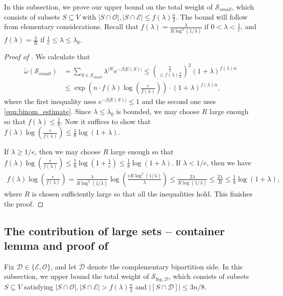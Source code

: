 \documentclass[reqno,a4paper,11pt]{amsart}
\newcommand{\cD}{\mathcal{D}}
\newcommand{\cE}{\mathcal{E}}
\newcommand{\cO}{\mathcal{O}}
\newcommand{\cS}{\mathcal{S}}
\newcommand{\lam}{\lambda}
\begin{document}
In this subsection, we prove our upper bound on the total weight of $\cS_{small}$, which consists of subsets $S \subseteq V$ with $|S \cap \cO|, |S \cap \cE| \leq f(\lam)\frac{n}{2}$. The bound will follow from elementary considerations. Recall that $f(\lam) = \frac{\lam}{R \log^2(1/\lam)}$ if $0 < \lam < \frac{1}{e}$, and $f(\lam) = \frac{\lam}{R}$ if $\frac{1}{e} \le \lam \le \lam_0$.
\begin{proof}[Proof of ]

We calculate that
\begin{align*}
    \tilde{\omega}(\cS_{small}) &= \sum_{S \in \cS_{small}} \lambda^{|S|} e^{- \beta |E(S)|} \leq \binom{\frac{n}{2}}{\leq f(\lam) \frac{n}{2}}^2 (1+\lambda)^{f(\lam)n} \\
    &\leq \exp\left( n \cdot f(\lam) \log\left(\frac{e}{f(\lam)}\right) \right) \cdot  (1+\lambda)^{f(\lam)n},
\end{align*}
where the first inequality uses $e^{-\beta |E(S)|} \le 1$ and the second one uses \eqref{eqn:binom_estimate}. Since $\lam \le \lam_0$ is bounded, we may choose $R$ large enough so that $f(\lam) \le \frac{1}{8}$. Now it suffices to show that $f(\lam) \log \left( \frac{e}{f(\lam)}\right) \le \frac{1}{8} \log(1+\lam)$. 

If $\lam \ge 1/e$, then we may choose $R$ large enough so that $f(\lam) \log \left( \frac{e}{f(\lam)}\right) \le \frac{1}{8}\log\left(1+\frac{1}{e}\right) \le \frac{1}{8} \log(1+\lam)$. If $\lam < 1/e$, then we have
\begin{align*}
    f(\lam) \log \left( \frac{e}{f(\lam)}\right) = \frac{\lam}{R \log^2(1/\lam)} \log \left( \frac{e R \log^2(1/\lam)}{\lam} \right) \le \frac{2 \lam}{R \log(1/\lam)} \le \frac{2\lam}{R} \le \frac{1}{8} \log(1+\lam),
\end{align*}
where $R$ is chosen sufficiently large so that all the inequalities hold. This finishes the proof.
\end{proof}

\subsection{The contribution of large sets -- container lemma and proof of } \label{sec:container}

Fix $\cD \in \{\cE, \cO\}$, and let $\overline{\cD}$ denote the complementary bipartition side. In this subsection, we upper bound the total weight of $\cS_{big, \cD}$, which consists of subsets $S \subseteq V$ satisfying $|S \cap \cO|, |S \cap \cE| > f(\lam) \frac{n}{2}$ and $|[S \cap \cD]| \le 3n/8$.
\end{document}
